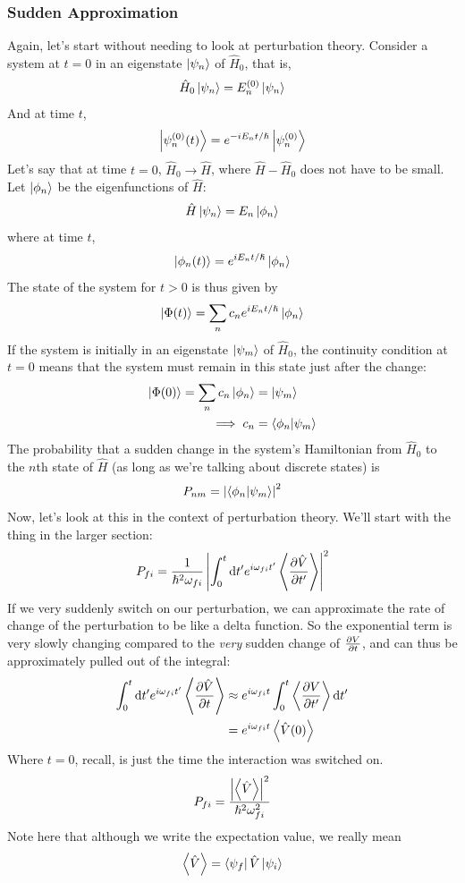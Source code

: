 \documentclass[a4paper]{article}
\begin{document}
\subsubsection{Sudden Approximation}
Again, let's start without needing to look at perturbation theory. Consider a
system at $t=0$ in an eigenstate $\left\lvert \psi_n\right\rangle$ of $\hat{H}_0$, that is,
	\[ \hat{H}_0\left\lvert \psi_n\right\rangle = E_n^{(0)}\left\lvert \psi_n\right\rangle \]
And at time $t$,
	\[ \left\lvert \psi_n^{(0)}(t)\right\rangle = e^{-iE_nt/\hslash}\left\lvert \psi^{(0)}_n\right\rangle\]
Let's say that at time $t=0$, $\hat{H}_0 \to \hat{H}$, where
$\hat{H}-\hat{H}_0$ does not have to be small. Let
$\left\lvert \phi_n\right\rangle$ be the eigenfunctions of $\hat{H}$:
	\[ \hat{H}\left\lvert \psi_n\right\rangle = E_n\left\lvert \phi_n\right\rangle \]
where at time $t$,
	\[ \left\lvert \phi_n(t)\right\rangle = e^{iE_nt/\hslash}\left\lvert \phi_n\right\rangle \]
The state of the system for $t>0$ is thus given by
\[
	\left\lvert \Phi(t)\right\rangle = \sum_nc_ne^{iE_nt/\hslash}\left\lvert \phi_n\right\rangle
\]
If the system is initially in an eigenstate $\left\lvert \psi_m\right\rangle$ of $\hat{H}_0$, the
continuity condition at $t=0$ means that the system must remain in this state
just after the change:
\begin{align*}
	\left\lvert \Phi(0)\right\rangle = \sum_n c_n\left\lvert \phi_n\right\rangle &= \left\lvert \psi_m\right\rangle\\
	\implies c_n &= \left\langle \phi_n\middle\vert \psi_m \right\rangle
\end{align*}
The probability that a sudden change in the system's Hamiltonian from
$\hat{H}_0$ to the $n$th state of $\hat{H}$ (as long as we're talking about
discrete states) is
	\[ P_{nm} = \left\lvert \left\langle \phi_n\middle\vert \psi_m \right\rangle\right\rvert^2 \]
Now, let's look at this in the context of perturbation theory. We'll start with
the thing in the larger section:
\[
	P_{fi} = \frac{1}{\hslash^2\omega_{fi}}\left\lvert 
		\int_0^t\mathrm{d} t' e^{i\omega_{fi}t'}\left\langle \frac{\partial \hat{V}}{\partial t'}\right\rangle\right\rvert^2
\]
If we very suddenly switch on our perturbation, we can approximate the rate
of change of the perturbation to be like a delta function. So the
exponential term is very slowly changing compared to the \emph{very}
sudden change of $\frac{\partial V}{\partial t}$, and can thus be approximately pulled out of the
integral:
\begin{align*}
	\int_0^t\mathrm{d} t' e^{i\omega_{fi}t'}\left\langle \frac{\partial \hat{V}}{\partial t}\right\rangle &\approx
		e^{i\omega_{fi}t}\int_0^t\left\langle \frac{\partial V}{\partial t'}\right\rangle\mathrm{d} t'\\
	&= e^{i\omega_{fi}t}\left\langle \hat{V}(0)\right\rangle
\end{align*}
Where $t=0$, recall, is just the time the interaction was switched on.
	\[ P_{fi} = \frac{\left\lvert \left\langle \hat{V}\right\rangle\right\rvert^2}{\hslash^2\omega_{fi}^2} \]
Note here that although we write the expectation value, we really mean
	\[ \left\langle \hat{V}\right\rangle = \left\langle \psi_f \right\rvert\hat{V}\left\lvert \psi_i\right\rangle \]
\end{document}
